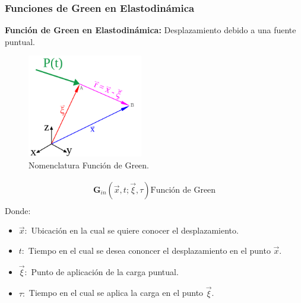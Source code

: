 \begin{frame}[allowframebreaks]
\frametitle{Funciones de Green en Elastodinámica}
%
\justifying
%
\textbf{Función de Green en Elastodinámica:} Desplazamiento debido a una fuente puntual.
%
\begin{figure}[h]
	\centering
	\includegraphics[height=4.5cm]{img/Figure1.pdf}
	\caption{Nomenclatura Función de Green.}
	\vspace{-.5 cm}
\end{figure}
%
\begin{align*}
	\mathbf{G}_{in} \left( \vec{x}, t; \vec{\xi}, \tau \right) \text{Función de Green}\\
\end{align*}
%
Donde:
%
\begin{itemize}
%
	\item $\vec{x}:$ Ubicación en la cual se quiere conocer el desplazamiento.
	\item $t:$ Tiempo en el cual se desea cononcer el desplazamiento en el punto $\vec{x}$.
	\item $\vec{\xi}:$ Punto de aplicación de la carga puntual.
	\item $\tau:$ Tiempo en el cual se aplica la carga en el punto $\vec{\xi}$.
%
\end{itemize}
%
%
\end{frame}
%
%
